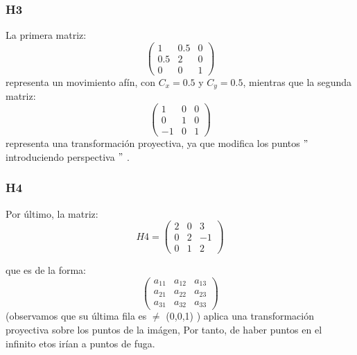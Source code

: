 \subsubsection{H3}
La primera matriz:
\begin{equation}
\begin{pmatrix}
  1 & 0.5 & 0\\ 0.5 & 2 & 0\\ 0 & 0 & 1
\end{pmatrix}
\end{equation} representa un movimiento afín, con $C_{x}=0.5$ y $C_{y}=0.5$, mientras que la segunda matriz:
\begin{equation}
\begin{pmatrix}
  1 & 0 & 0\\ 0 & 1 & 0\\ -1 & 0 & 1
\end{pmatrix}
\end{equation} representa una transformación proyectiva, ya que modifica los puntos $"$ introduciendo perspectiva $"$ .

\subsubsection{H4}
Por último, la matriz:
\begin{equation}
H4  =
\begin{pmatrix}
  2 & 0 & 3\\ 0 & 2 & -1\\ 0 & 1 & 2
\end{pmatrix}
\end{equation}

que es de la forma:
\[\begin{pmatrix} a_{11}&a_{12} &a_{13} \\ a_{21}&a_{22} &a_{23} \\ a_{31}&a_{32} &a_{33} \end{pmatrix}\]
(observamos que su última fila es $\neq$ (0,0,1) ) aplica una transformación proyectiva sobre los puntos de la imágen, Por tanto, de haber
puntos en el infinito etos irían a puntos de fuga.

